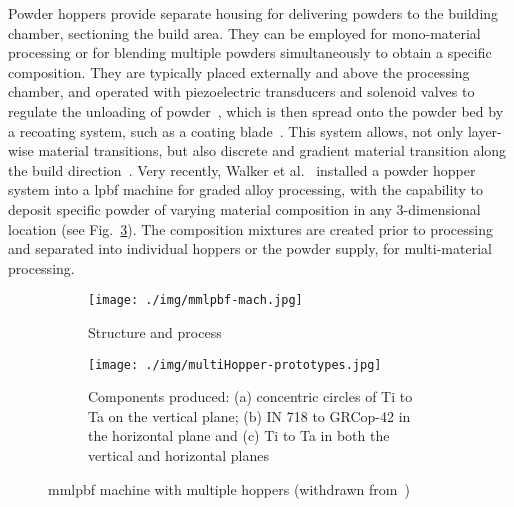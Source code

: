 Powder hoppers provide separate housing for delivering powders to the
building chamber, sectioning the build area. They can be employed for mono-material
processing or for blending multiple powders simultaneously to obtain a specific composition. They are typically placed externally and above the processing
chamber, and operated with piezoelectric transducers and solenoid valves to
regulate the unloading of powder~\cite{wang2022multi, chen2020influence}, which is then spread onto the powder bed by a
recoating system, such as a coating blade~\cite{wang2022multi}. This system allows, not only
layer-wise material transitions, but also discrete
and gradient material transition along the build
direction~\cite{demir2017multi}. Very recently, Walker et
al.~\cite{walker2022multi} installed a powder hopper system into a \gls{lpbf}
machine for graded alloy processing, with the capability to deposit specific powder of varying material composition in any 3-dimensional location (see Fig.~\ref{fig:mmlpbf-mach}).
The composition mixtures
are created prior to processing and separated into individual hoppers or the
powder supply, for multi-material processing.

%
\begin{figure}[!hbtp]
  \centering
  \begin{subfigure}[t]{1.0\textwidth}
  \centering
  \texttt{[image: ./img/mmlpbf-mach.jpg]}%
  \caption{Structure and process}%
  \label{fig:mmlpbf-multiHopper}
  \end{subfigure}
%
  \begin{subfigure}[t]{1.0\textwidth}
  \centering
  \texttt{[image: ./img/multiHopper-prototypes.jpg]}
  \caption{Components produced: (a) concentric circles of Ti to Ta on the
    vertical plane; (b) IN 718 to GRCop-42 in the horizontal plane and (c) Ti to Ta in both the vertical and horizontal planes}%
  \label{fig:mmlpbf-multiHopper-prototypes}
\end{subfigure}

    \caption[MMLPBF machine with multiple hoppers]{\gls{mmlpbf} machine with
      multiple hoppers (withdrawn from~\cite{walker2022multi})\footnotemark}%
    \label{fig:mmlpbf-mach}
\end{figure}
%

